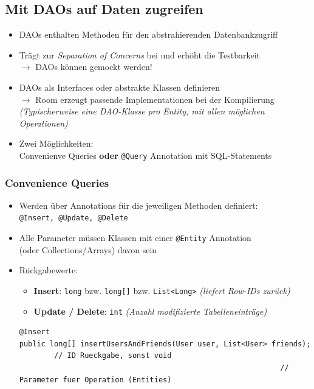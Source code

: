 \documentclass[a4paper]{article}
\begin{document}
\newpage

\subsection{Mit DAOs auf Daten zugreifen}

\begin{itemize}
	\item DAOs enthalten Methoden für den abstrahierenden Datenbankzugriff
	\item Trägt zur \textit{Separation of Concerns} bei und erhöht die Testbarkeit\\
	$\rightarrow$ DAOs können gemockt werden!
	\item DAOs als Interfaces oder abstrakte Klassen definieren\\
	$\rightarrow$ Room erzeugt passende Implementationen bei der Kompilierung\\
	\textit{(Typischerweise eine DAO-Klasse pro Entity, mit allen möglichen Operationen)}
	\item Zwei Möglichkeiten:\\
	Convenienve Queries \textbf{oder} \texttt{@Query} Annotation mit SQL-Statements
\end{itemize}

\subsubsection{Convenience Queries}

\begin{itemize}
	\item Werden über Annotations für die jeweiligen Methoden definiert:\\
	\texttt{@Insert, @Update, @Delete}
	\item Alle Parameter müssen Klassen mit einer \texttt{@Entity} Annotation \\
	(oder Collections/Arrays) davon sein
	\item Rückgabewerte:
		\begin{itemize}
			\item \textbf{Insert}: \texttt{long} bzw. \texttt{long[]} bzw. \texttt{List<Long>} \textit{(liefert Row-IDs zurück)}
			\item \textbf{Update / Delete}: \texttt{int} \textit{(Anzahl modifizierte Tabelleneinträge)}
		\end{itemize}
	\begin{lstlisting}
@Insert
public long[] insertUsersAndFriends(User user, List<User> friends);
		// ID Rueckgabe, sonst void
															// Parameter fuer Operation (Entities)
	\end{lstlisting}
\end{itemize}
\end{document}
